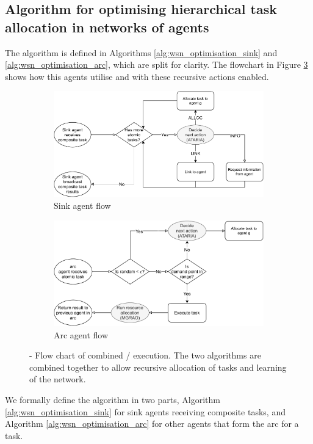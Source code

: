 \subsection{Algorithm for optimising hierarchical task allocation in networks of agents}

The \acronymWSNOptimisationExtended{}{} algorithm is defined in Algorithms \ref{alg:wsn_optimisation_sink}
and \ref{alg:wsn_optimisation_arc}, which are split for clarity. The flowchart in Figure \ref{fig:algorithm-flow} shows how this agents utilise \acronymATARIA{}{} and \acronymMGRAO{}{} with these recursive actions enabled. 
\begin{figure}[ht]
	\centering
	\begin{subfigure}{.49\textwidth}
		\centering
		\includegraphics[width=0.9\linewidth]{algorithm-flow-sink}
		\caption{Sink agent flow}
		\label{fig:algorithm-flow-sink}
	\end{subfigure}
	\begin{subfigure}{.49\textwidth}
		\centering	\includegraphics[width=0.9\linewidth]{algorithm-flow-arc}
		\caption{Arc agent flow}
		\label{fig:algorithm-flow-arc}
	\end{subfigure}
	\caption{\textbf{\acronymWSNOptimisation{}{}} - Flow chart of combined \acronymATARIA{}{}/\acronymMGRAO{}{} execution. The two algorithms are combined together to allow recursive allocation of tasks and learning of the network.}
	\label{fig:algorithm-flow}
\end{figure}
We formally define the \acronymWSNOptimisation{}{} algorithm in two parts, Algorithm \ref{alg:wsn_optimisation_sink} for sink agents receiving composite tasks, and Algorithm \ref{alg:wsn_optimisation_arc} for other agents that form the arc for a task.

